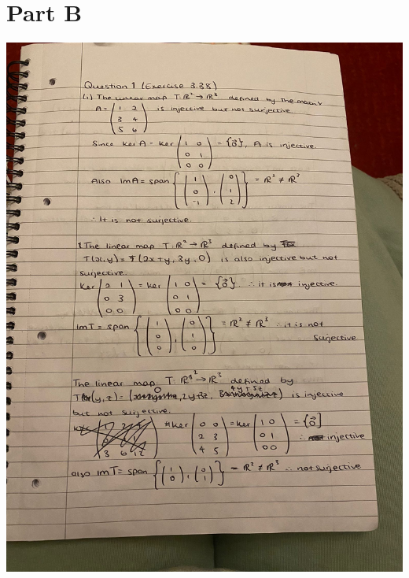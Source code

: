 \documentclass{article}
\begin{document}
\break
\section{Part B}

\includegraphics[scale = 0.2]{IMG-20231126-WA0002.jpg}
\end{document}
